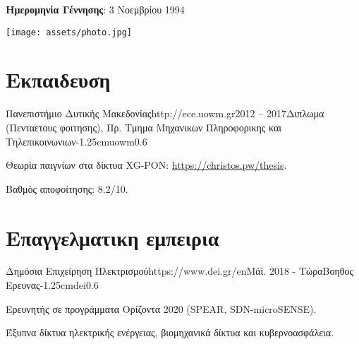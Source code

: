 \documentclass{mycv}
\begin{document}
	\thispagestyle{plain}
	\begin{minipage}{.7\textwidth}
		\begin{flushleft}
			\centering
			{\bf Ημερομηνία Γέννησης}: 3 Νοεμβρίου 1994
		\end{flushleft}
	\end{minipage}
	\begin{minipage}{.3\textwidth}
		\begin{flushright}
			\texttt{[image: assets/photo.jpg]}
		\end{flushright}
	\end{minipage}
	\section{Εκπαιδευση}
	
	\begin{EntryDatedLogo}{Πανεπιστήμιο Δυτικής Μακεδονίας}{http://ece.uowm.gr}{2012 -- 2017}{Διπλωμα (Πενταετους φοιτησης), Πρ. Τμημα Μηχανικων Πληροφορικης και Τηλεπικοινωνιων}{-1.25cm}{uowm}{0.6}
		\begin{Itemize}
			\item Θεωρία παιγνίων στα δίκτυα XG-PON: \url{https://christos.pw/thesis}.
			\item Βαθμός αποφοίτησης: 8.2/10.
		\end{Itemize}
	\end{EntryDatedLogo}
	
	\section{Επαγγελματικη εμπειρια}
	\begin{EntryDatedLogo}{Δημόσια Επιχείρηση Ηλεκτρισμού}{https://www.dei.gr/en}{Μάϊ. 2018 - Τώρα}{Βοηθος Ερευνας}{-1.25cm}{dei}{0.6}
	\begin{Itemize}
		\item Ερευνητής σε προγράμματα Ορίζοντα 2020 (SPEAR, SDN-microSENSE).
		\item Έξυπνα δίκτυα ηλεκτρικής ενέργειας, βιομηχανικά δίκτυα και κυβερνοασφάλεια.
	\end{Itemize}
	\end{EntryDatedLogo}
\end{document}
